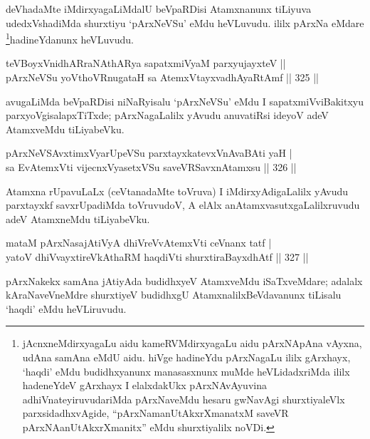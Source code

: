 \begin{artha}
deVhadaMte iMdirxyagaLiMdalU beVpaRDisi Atamxnanunx tiLiyuva udedxVshadiMda shurxtiyu `pArxNeVSu' eMdu heVLuvudu. ililx pArxNa eMdare \footnote{jAcnxneMdirxyagaLu aidu kameRVMdirxyagaLu aidu pArxNApAna vAyxna, udAna samAna eMdU aidu. hiVge hadineYdu pArxNagaLu ililx gArxhayx, `haqdi' eMdu budidhxyanunx manasasxnunx muMde heVLidadxriMda ililx hadeneYdeV gArxhayx I elalxdakUkx pArxNAvAyuvina adhiVnateyiruvudariMda pArxNaveMdu hesaru gwNavAgi shurxtiyaleVlx parxsidadhxvAgide, ``pArxNamanUtAkxrXmanatxM saveVR pArxNAanUtAkxrXmanitx'' eMdu shurxtiyalilx noVDi.}hadineYdanunx heVLuvudu.
\end{artha}

\begin{shl}
teVBoyxVnidhARraNAthARya sapatxmiVyaM parxyujayxteV ||  \\
pArxNeVSu yoV\s thoVR\s nugataH sa AtemxVtayxvadhAyaRtAmf \hfill||  325 ||  
\end{shl}

\begin{artha}
avugaLiMda beVpaRDisi niNaRyisalu `pArxNeVSu' eMdu I sapatxmiVviBakitxyu parxyoVgisalapxTiTxde; pArxNagaLalilx yAvudu anuvatiRsi ideyoV adeV AtamxveMdu tiLiyabeVku.
\end{artha}

\begin{shl}
pArxNeVSAvxtimxVyarUpeVSu parxtayxkatevxVnAvaBAti yaH | \\
sa EvA\s \s temxVti vijecnxVyasetxVSu saveVRSavxnAtamxsu \hfill||  326 ||  
\end{shl}

\begin{artha}
Atamxna rUpavuLaLx (ceVtanadaMte toVruva) I iMdirxyAdigaLalilx yAvudu parxtayxkf savxrUpadiMda toVruvudoV, A elAlx anAtamxvasutxgaLalilxruvudu adeV AtamxneMdu tiLiyabeVku.
\end{artha}


\begin{shl}
mataM pArxNasajAtiVyA dhiVreVvA\s \s temxVti ceVnanx tatf | \\
yatoV dhiVvayxtireVkAthaRM haqdiVti shurxtiraBayxdhAtf \hfill||  327 || 
\end{shl}

\begin{artha}
pArxNakekx samAna jAtiyAda budidhxyeV AtamxveMdu iSaTxveMdare; adalalx kAraNaveVneMdre shurxtiyeV budidhxgU AtamxnalilxBeVdavanunx tiLisalu `haqdi' eMdu heVLiruvudu.
\end{artha}

